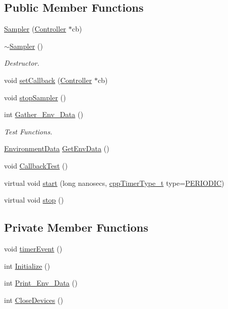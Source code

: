 \subsection*{Public Member Functions}
\begin{DoxyCompactItemize}
\item 
\hyperlink{classSampler_aec4905ed5f8259bb5e361da172bf7f17}{Sampler} (\hyperlink{classController}{Controller} $\ast$cb)
\item 
\hyperlink{classSampler_afbbbd238b78dd3024686c852b69fa64e}{$\sim$\+Sampler} ()
\begin{DoxyCompactList}\small\item\em Destructor. \end{DoxyCompactList}\item 
void \hyperlink{classSampler_a026a0839919e8e93fa75f19b67ccffc6}{set\+Callback} (\hyperlink{classController}{Controller} $\ast$cb)
\item 
void \hyperlink{classSampler_af661f48134a6d0f1f2d6080f5025392e}{stop\+Sampler} ()
\item 
int \hyperlink{classSampler_a5702d0ef89adb532fef4f9879e7e36d4}{Gather\+\_\+\+Env\+\_\+\+Data} ()
\begin{DoxyCompactList}\small\item\em Test Functions. \end{DoxyCompactList}\item 
\hyperlink{structEnvironmentData}{Environment\+Data} \hyperlink{classSampler_a22edd729c6bbb5582ebac7681041cf55}{Get\+Env\+Data} ()
\item 
void \hyperlink{classSampler_a4e239960ef9947af152ba441ba152cd0}{Callback\+Test} ()
\item 
virtual void \hyperlink{classCppTimer_a64989025caa3c030c6c397ca76a2d20b}{start} (long nanosecs, \hyperlink{CppTimer_8h_a110d07ab6a96d7815149d3d95435790a}{cpp\+Timer\+Type\+\_\+t} type=\hyperlink{CppTimer_8h_a110d07ab6a96d7815149d3d95435790aae4379d044711537d9ce3b3b58c575c58}{P\+E\+R\+I\+O\+D\+IC})
\item 
virtual void \hyperlink{classCppTimer_a4bb95ddee98a536d0818b8f6096bf7e7}{stop} ()
\end{DoxyCompactItemize}
\subsection*{Private Member Functions}
\begin{DoxyCompactItemize}
\item 
void \hyperlink{classSampler_addf333c6e247ee3a1def41260caa902a}{timer\+Event} ()
\item 
int \hyperlink{classSampler_a1aed5b32bf99312ba38d092f1acad3d9}{Initialize} ()
\item 
int \hyperlink{classSampler_acf3d04a740356e54fe53766a7f00ae15}{Print\+\_\+\+Env\+\_\+\+Data} ()
\item 
int \hyperlink{classSampler_a24077f1eeb2491b65f9577efd07dffd6}{Close\+Devices} ()
\end{DoxyCompactItemize}
